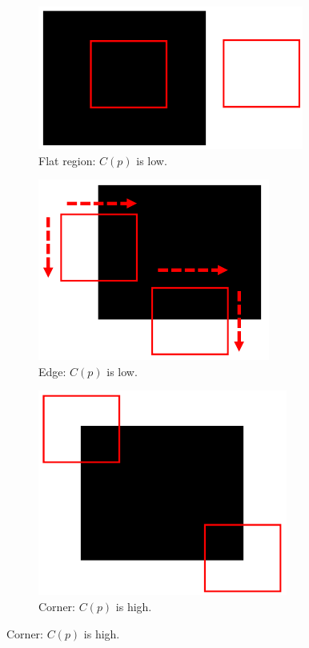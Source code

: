 \begin{figure}[H]
    \centering
    \begin{subfigure}{0.3\linewidth}
        \includegraphics[width=0.9\linewidth]{./img/_corner_detector_example_flat.pdf}
        \caption{Flat region: $C(p)$ is low.}
    \end{subfigure}
    \begin{subfigure}{0.3\linewidth}
        \includegraphics[width=0.8\linewidth]{./img/_corner_detector_example_edge.pdf}
        \caption{Edge: $C(p)$ is low.}
    \end{subfigure}
    \begin{subfigure}{0.3\linewidth}
        \includegraphics[width=0.8\linewidth]{./img/_corner_detector_example_corner.pdf}
        \caption{Corner: $C(p)$ is high.}
    \end{subfigure}
\end{figure}

